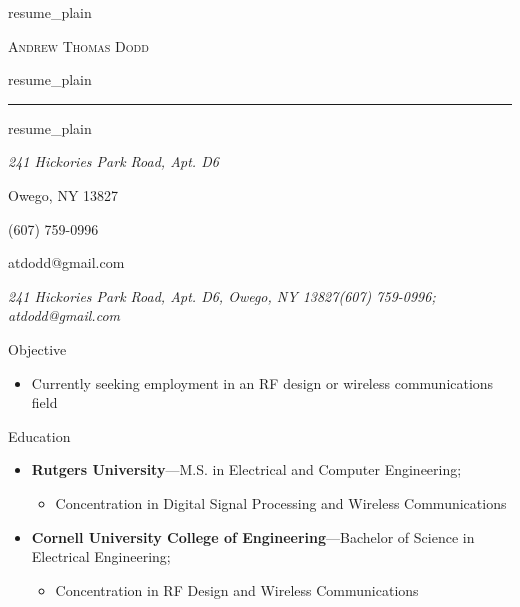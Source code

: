 \documentclass[10pt,oneside]{article}
\makeatletter
\newcommand{\name}{Andrew Thomas Dodd}
\newcommand{\addra}{241 Hickories Park Road, Apt. D6}
\newcommand{\addrb}{Owego, NY 13827}
\newcommand{\addr}{\addra, \addrb}
\newcommand{\phone}{(607) 759-0996}
\newcommand{\email}{atdodd@gmail.com}
\def\txtname{resume_plain}\edef\txtname{\expandafter\strip@prefix\meaning\txtname}
\edef\fname{\jobname}
\newcommand{\bigname}[1]{
	\begin{center}\Huge\scshape#1\end{center}
}
\newenvironment{ressection}[1]{
	\vspace{4pt}
	{\Large#1}
	\begin{itemize}
	\vspace{3pt}
}{
	\end{itemize}
}
\newcommand{\resitem}[1]{
	\vspace{-4pt}
	\item \begin{flushleft} #1 \end{flushleft}
}
\newcommand{\ressubitem}[1]{
	\vspace{-1pt}
	\item \begin{flushleft} #1 \end{flushleft}
}
\newcommand{\resbigitem}[3]{
	\vspace{-5pt}
	\item
	\textbf{#1}---#2; \quad \textit{#3}
}
\newenvironment{ressubsec}[3]{
	\resbigitem{#1}{#2}{#3}
	\vspace{-2pt}
	\begin{itemize}
}{
	\end{itemize}
}
\newcommand{\bigname}[1]{
	\begin{center}\fontfamily{phv}\selectfont\Huge\scshape#1\end{center}
}
\newenvironment{ressection}[1]{
	\vspace{4pt}
	{\fontfamily{phv}\selectfont\Large#1}
	\begin{itemize}
	\vspace{3pt}
}{
	\end{itemize}
}
\newcommand{\resitem}[1]{
	\vspace{-4pt}
	\item \begin{flushleft} #1 \end{flushleft}
}
\newcommand{\ressubitem}[1]{
	\vspace{-1pt}
	\item \begin{flushleft} #1 \end{flushleft}
}
\newcommand{\resbigitem}[2]{
	\vspace{-5pt}
	\item
	\textbf{#1}---\textit{#2}
}
\newenvironment{ressubsec}[2]{
	\resbigitem{#1}{#2}
	\vspace{-2pt}
	\begin{itemize}
}{
	\end{itemize}
}
\makeatother
\begin{document}
\ifx\fname\txtname
\else
{} \selectfont
\fi

\bigname{\name}

\ifx\fname\txtname
\else
\vspace{-8pt} \rule{\textwidth}{1pt}
\fi

\ifx\fname\txtname
\vspace{-1pt} {\small\itshape \addra

\addrb

\phone

\email}

\else
\vspace{-1pt} {\small\itshape \addr \hfill \phone; \email}
\fi

\vspace{8 pt}


\begin{ressection}{Objective}
	\resitem{Currently seeking employment in an RF design or wireless communications field}
\end{ressection}

\begin{ressection}{Education}

	\begin{ressubsec}{Rutgers University}{M.S. in Electrical and Computer Engineering}
		\ressubitem{Graduated in December 2005}
		\ressubitem{Concentration in Digital Signal Processing and Wireless Communications}
	\end{ressubsec}

	\begin{ressubsec}{Cornell University College of Engineering}{Bachelor of Science in Electrical Engineering}
		\ressubitem{Graduated in May 2002: John McMullen Dean's Scholar}
		\ressubitem{Concentration in RF Design and Wireless Communications}
	\end{ressubsec}

\end{ressection}
\end{document}
